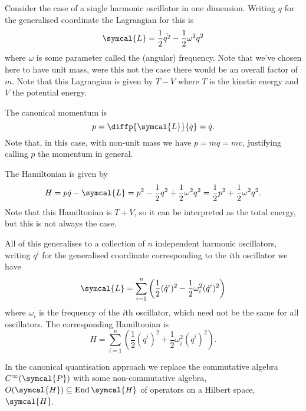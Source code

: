 \documentclass[fleqn]{NotesClass}
\newcommand{\lagrangian}{\symcal{L}}
\newcommand{\phaseSpace}{\symcal{P}}
\newcommand{\hilbertSpace}{\symcal{H}}
\DeclareMathOperator{\End}{End}
\begin{document}
    \begin{exm}{}{}
        Consider the case of a single harmonic oscillator in one dimension.
        Writing \(q\) for the generalised coordinate the Lagrangian for this is
        \begin{equation}
            \lagrangian = \frac{1}{2}\dot{q^2} - \frac{1}{2}\omega^2 q^2
        \end{equation}
        where \(\omega\) is some parameter called the (angular) frequency.
        Note that we've chosen here to have unit mass, were this not the case there would be an overall factor of \(m\).
        Note that this Lagrangian is given by \(T - V\) where \(T\) is the kinetic energy and \(V\) the potential energy.
        
        The canonical momentum is
        \begin{equation}
            p = \diffp{\lagrangian}{\dot{q}} = \dot{q}.
        \end{equation}
        Note that, in this case, with non-unit mass we have \(p = m\dot{q} = mv\), justifying calling \(p\) the momentum in general.
        
        The Hamiltonian is given by
        \begin{equation}
            H = p\dot{q} - \lagrangian = p^2 - \frac{1}{2}q^2 + \frac{1}{2}\omega^2q^2 = \frac{1}{2}p^2 + \frac{1}{2}\omega^2q^2.
        \end{equation}
        Note that this Hamiltonian is \(T + V\), so it can be interpreted as the total energy, but this is not always the case.
        
        All of this generalises to a collection of \(n\) independent harmonic oscillators, writing \(q^i\) for the generalised coordinate corresponding to the \(i\)th oscillator we have
        \begin{equation}
            \lagrangian = \sum_{i=1}^{n}\left( \frac{1}{2}(\dot{q}^i)^2 - \frac{1}{2} \omega^2_i (\dot{q}^i)^2 \right)
        \end{equation}
        where \(\omega_i\) is the frequency of the \(i\)th oscillator, which need not be the same for all oscillators.
        The corresponding Hamiltonian is
        \begin{equation}
            H = \sum_{i=1}^{n}\left( \frac{1}{2}(\dot{q}^i)^2 + \frac{1}{2} \omega^2_i (\dot{q}^i)^2 \right).
        \end{equation}
    \end{exm}
    
    In the canonical quantisation approach we replace the commutative algebra \(C^{\infty}(\phaseSpace)\) with some non-commutative algebra, \(O(\hilbertSpace) \subseteq \End \hilbertSpace\) of operators on a Hilbert space, \(\hilbertSpace\).
    
\end{document}
